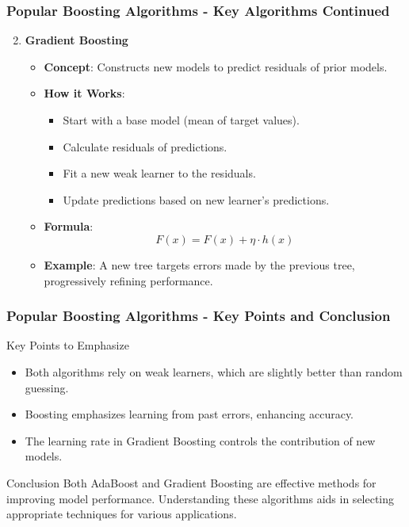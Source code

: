 \documentclass[aspectratio=169]{beamer}
\begin{document}
\begin{frame}[fragile]
    \frametitle{Popular Boosting Algorithms - Key Algorithms Continued}
    \begin{enumerate}
        \setcounter{enumi}{1}
        \item \textbf{Gradient Boosting}
            \begin{itemize}
                \item \textbf{Concept}: Constructs new models to predict residuals of prior models.
                \item \textbf{How it Works}:
                    \begin{itemize}
                        \item Start with a base model (mean of target values).
                        \item Calculate residuals of predictions.
                        \item Fit a new weak learner to the residuals.
                        \item Update predictions based on new learner's predictions.
                    \end{itemize}
                \item \textbf{Formula}:
                    \begin{equation}
                    F(x) = F(x) + \eta \cdot h(x)
                    \end{equation}
                \item \textbf{Example}: A new tree targets errors made by the previous tree, progressively refining performance.
            \end{itemize}
    \end{enumerate}
\end{frame}

\begin{frame}[fragile]
    \frametitle{Popular Boosting Algorithms - Key Points and Conclusion}
    \begin{block}{Key Points to Emphasize}
        \begin{itemize}
            \item Both algorithms rely on weak learners, which are slightly better than random guessing.
            \item Boosting emphasizes learning from past errors, enhancing accuracy.
            \item The learning rate in Gradient Boosting controls the contribution of new models.
        \end{itemize}
    \end{block}
    
    \begin{block}{Conclusion}
        Both AdaBoost and Gradient Boosting are effective methods for improving model performance. Understanding these algorithms aids in selecting appropriate techniques for various applications.
    \end{block}
\end{frame}
\end{document}
